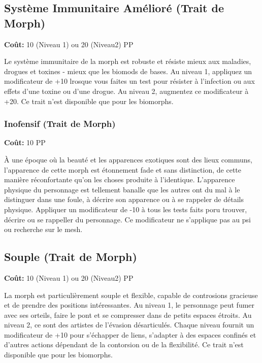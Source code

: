 \subsection{Système Immunitaire Amélioré (Trait de Morph)} \label{sec:traits-improved-immune-system} 

\textbf{Coût:} 10 (Niveau 1) ou 20 (Niveau2) PP 

Le système immunitaire de la morph est robuste et résiste mieux aux maladies, drogues et toxines - mieux que les biomods de bases. Au niveau 1, appliquez un modificateur de +10 lrosque vous faites un test pour résister à l'infection ou aux effets d'une toxine ou d'une drogue. Au niveau 2, augmentez ce modificateur à +20. Ce trait n'est disponible que pour les biomorphs. 

\subsubsection{Inofensif (Trait de Morph)} \label{sec:traits-innocuous} 

\textbf{Coût:} 10 PP 

À une époque où la beauté et les apparences exotiques sont des lieux communs, l'apparence de cette morph est étonnement fade et sans distinction, de cette manière réconfortante qu'on les choses produite à l'identique. L'apparence physique du personnage est tellement banalle que les autres ont du mal à le distinguer dans une foule, à décrire son apparence ou à se rappeler de détails physique. Appliquer un modificateur de -10 à tous les tests faits poru trouver, décrire ou se rappeller du personnage. Ce modificateur ne s'applique pas au psi ou recherche sur le mesh. 

\subsection{Souple (Trait de Morph)} \label{sec:traits-limber} 

\textbf{Coût:} 10 (Niveau 1) ou 20 (Niveau2) PP 

La morph est particulièrement souple et flexible, capable de controsions gracieuse et de prendre des positions intéressantes. Au niveau 1, le personnage peut fumer avec ses orteils, faire le pont et se compresser dans de petits espaces étroits. Au niveau 2, ce sont des artistes de l'évasion désarticulés. Chaque niveau fournit un modificateur de +10 pour s'échapper de liens, s'adapter à des espaces confinés et d'autres actions dépendant de la contorsion ou de la flexibilité. Ce trait n'est disponible que pour les biomorphs. 

